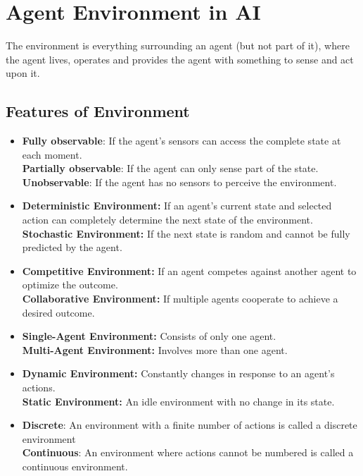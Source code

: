 \section{Agent Environment in AI}

The environment is everything surrounding an agent (but not part of it), where the agent lives, operates and provides the agent with something to sense and act upon it.

\subsection*{Features of Environment}

\begin{itemize}
   \item 
   \textbf{Fully observable}: If the agent's sensors can access the complete state at each moment.\\
	\textbf{Partially observable}: If the agent can only sense part of the state.\\
	\textbf{Unobservable}: If the agent has no sensors to perceive the environment.

   \item 
   \textbf{Deterministic Environment:} If an agent's current state and selected action can completely determine the next state of the environment.\\ 
   \textbf{Stochastic Environment:} If the next state is random and cannot be fully predicted by the agent.


   \item
   \textbf{Competitive Environment:} If an agent competes against another agent to optimize the outcome.\\
   \textbf{Collaborative Environment:} If multiple agents cooperate to achieve a desired outcome.
   
   
   \item
   \textbf{Single-Agent Environment:} Consists of only one agent.\\
   \textbf{Multi-Agent Environment:} Involves more than one agent.
   
   
   \item
   \textbf{Dynamic Environment:} Constantly changes in response to an agent's actions.\\
   \textbf{Static Environment:} An idle environment with no change in its state.
   
   
   \item
   \textbf{Discrete}: An environment with a finite number of actions is called a discrete environment\\
   \textbf{Continuous}: An environment where actions cannot be numbered is called a continuous environment.
   

\end{itemize}
